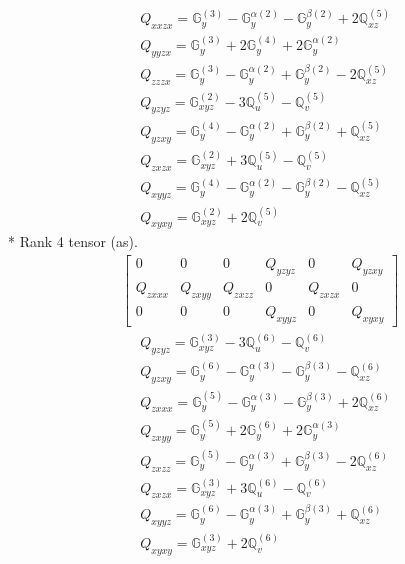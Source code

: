 \documentclass[fleqn,8pt,landscape]{jsarticle}
\begin{document}
\begin{align*}
& Q_{xxzx} = \mathbb{G}_{y}^{(3)} - \mathbb{G}_{y}^{\alpha(2)} - \mathbb{G}_{y}^{\beta(2)} + 2 \mathbb{Q}_{xz}^{(5)} \\
& Q_{yyzx} = \mathbb{G}_{y}^{(3)} + 2 \mathbb{G}_{y}^{(4)} + 2 \mathbb{G}_{y}^{\alpha(2)} \\
& Q_{zzzx} = \mathbb{G}_{y}^{(3)} - \mathbb{G}_{y}^{\alpha(2)} + \mathbb{G}_{y}^{\beta(2)} - 2 \mathbb{Q}_{xz}^{(5)} \\
& Q_{yzyz} = \mathbb{G}_{xyz}^{(2)} - 3 \mathbb{Q}_{u}^{(5)} - \mathbb{Q}_{v}^{(5)} \\
& Q_{yzxy} = \mathbb{G}_{y}^{(4)} - \mathbb{G}_{y}^{\alpha(2)} + \mathbb{G}_{y}^{\beta(2)} + \mathbb{Q}_{xz}^{(5)} \\
& Q_{zxzx} = \mathbb{G}_{xyz}^{(2)} + 3 \mathbb{Q}_{u}^{(5)} - \mathbb{Q}_{v}^{(5)} \\
& Q_{xyyz} = \mathbb{G}_{y}^{(4)} - \mathbb{G}_{y}^{\alpha(2)} - \mathbb{G}_{y}^{\beta(2)} - \mathbb{Q}_{xz}^{(5)} \\
& Q_{xyxy} = \mathbb{G}_{xyz}^{(2)} + 2 \mathbb{Q}_{v}^{(5)}
\end{align*}
* Rank 4 tensor (as).
\begin{align*}
\begin{bmatrix} 0 & 0 & 0 & Q_{yzyz} & 0 & Q_{yzxy} \\ Q_{zxxx} & Q_{zxyy} & Q_{zxzz} & 0 & Q_{zxzx} & 0 \\ 0 & 0 & 0 & Q_{xyyz} & 0 & Q_{xyxy} \end{bmatrix}
\end{align*}
\begin{align*}
& Q_{yzyz} = \mathbb{G}_{xyz}^{(3)} - 3 \mathbb{Q}_{u}^{(6)} - \mathbb{Q}_{v}^{(6)} \\
& Q_{yzxy} = \mathbb{G}_{y}^{(6)} - \mathbb{G}_{y}^{\alpha(3)} - \mathbb{G}_{y}^{\beta(3)} - \mathbb{Q}_{xz}^{(6)} \\
& Q_{zxxx} = \mathbb{G}_{y}^{(5)} - \mathbb{G}_{y}^{\alpha(3)} - \mathbb{G}_{y}^{\beta(3)} + 2 \mathbb{Q}_{xz}^{(6)} \\
& Q_{zxyy} = \mathbb{G}_{y}^{(5)} + 2 \mathbb{G}_{y}^{(6)} + 2 \mathbb{G}_{y}^{\alpha(3)} \\
& Q_{zxzz} = \mathbb{G}_{y}^{(5)} - \mathbb{G}_{y}^{\alpha(3)} + \mathbb{G}_{y}^{\beta(3)} - 2 \mathbb{Q}_{xz}^{(6)} \\
& Q_{zxzx} = \mathbb{G}_{xyz}^{(3)} + 3 \mathbb{Q}_{u}^{(6)} - \mathbb{Q}_{v}^{(6)} \\
& Q_{xyyz} = \mathbb{G}_{y}^{(6)} - \mathbb{G}_{y}^{\alpha(3)} + \mathbb{G}_{y}^{\beta(3)} + \mathbb{Q}_{xz}^{(6)} \\
& Q_{xyxy} = \mathbb{G}_{xyz}^{(3)} + 2 \mathbb{Q}_{v}^{(6)}
\end{align*}
\end{document}
